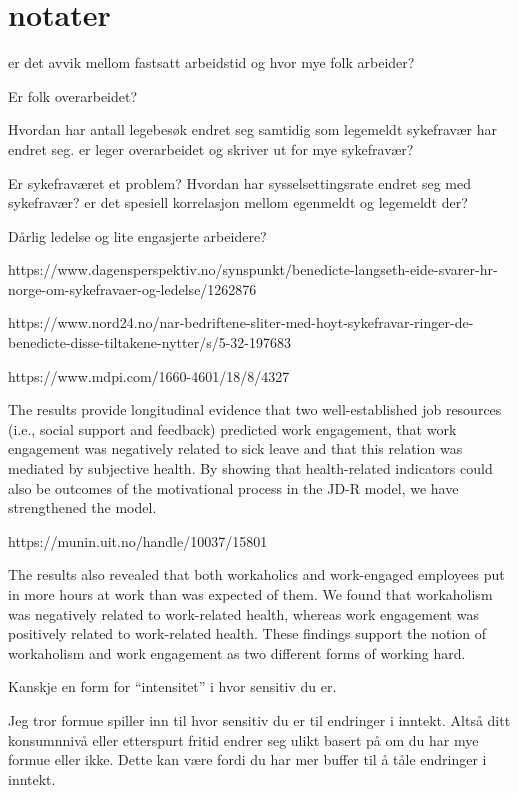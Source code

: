 \documentclass[
  12pt,
  a4paper,
  DIV=11,
  numbers=noendperiod]{scrartcl}
\begin{document}
\clearpage

\section{notater}\label{notater}

er det avvik mellom fastsatt arbeidstid og hvor mye folk arbeider?

Er folk overarbeidet?

Hvordan har antall legebesøk endret seg samtidig som legemeldt
sykefravær har endret seg. er leger overarbeidet og skriver ut for mye
sykefravær?

Er sykefraværet et problem? Hvordan har sysselsettingsrate endret seg
med sykefravær? er det spesiell korrelasjon mellom egenmeldt og
legemeldt der?

Dårlig ledelse og lite engasjerte arbeidere?

https://www.dagensperspektiv.no/synspunkt/benedicte-langseth-eide-svarer-hr-norge-om-sykefravaer-og-ledelse/1262876

https://www.nord24.no/nar-bedriftene-sliter-med-hoyt-sykefravar-ringer-de-benedicte-disse-tiltakene-nytter/s/5-32-197683

https://www.mdpi.com/1660-4601/18/8/4327

The results provide longitudinal evidence that two well-established job
resources (i.e., social support and feedback) predicted work engagement,
that work engagement was negatively related to sick leave and that this
relation was mediated by subjective health. By showing that
health-related indicators could also be outcomes of the motivational
process in the JD-R model, we have strengthened the model.

https://munin.uit.no/handle/10037/15801

The results also revealed that both workaholics and work-engaged
employees put in more hours at work than was expected of them. We found
that workaholism was negatively related to work-related health, whereas
work engagement was positively related to work-related health. These
findings support the notion of workaholism and work engagement as two
different forms of working hard.

Kanskje en form for ``intensitet'' i hvor sensitiv du er.

Jeg tror formue spiller inn til hvor sensitiv du er til endringer i
inntekt. Altså ditt konsumnnivå eller etterspurt fritid endrer seg ulikt
basert på om du har mye formue eller ikke. Dette kan være fordi du har
mer buffer til å tåle endringer i inntekt.
\end{document}
